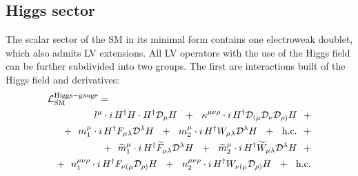\documentclass[12pt,preprintnumbers,nofootinbib]{revtex4}
\newcommand{\wt}{\widetilde}
\newcommand{\md}{\mathcal{D}}
\begin{document}
\subsection{Higgs sector}	
	The scalar sector of the SM in its minimal form contains one electroweak doublet,
which also admits LV extensions. All LV operators with the use of the Higgs field can 
be further subdivided into two groups. 
	The first are interactions built of the Higgs field and 
	derivatives:
\begin{eqnarray}
\nonumber
\lefteqn{
	\mathcal{L}_{\rm SM}^{\rm Higgs-gauge} =
	}
	\\
\nonumber
	&&
	\phantom{+~~}
	l^\mu \cdot
	i\, 
	H^\dag H \cdot H^\dag \md_\mu H
	~~+~~
	\kappa^{\mu\nu\rho} \cdot
	i\, 
	H^\dag \md_{(\mu} \md_\nu \md_{\rho)} H
	~~+
	\\
\label{Higgs_gauge}
	&&
	+~~
	m^\mu_1 \cdot
	i\, 
	H^\dag F_{\mu\lambda} \md^\lambda H
	~~+~~
	m^\mu_2 \cdot
	i\, 
	H^\dag W_{\mu\lambda} \md^\lambda H
	~~+~~
	\text{h.c.}
	~~+
	\\
\nonumber
	&&
	+~~
	\wt{m}^\mu_1 \cdot
	i\, 
	H^\dag \wt{F}_{\mu\lambda} \md^\lambda H
	~~+~~
	\wt{m}^\mu_2 \cdot
	i\, 
	H^\dag \wt{W}_{\mu\lambda} \md^\lambda H
	~~+
	\\
\nonumber
	&&
	+~~
	n^{\mu\nu\rho}_{1} \cdot
	i\, 
	H^\dag F_{\nu(\mu} \md_{\rho)} H
	~~+~~
	n^{\mu\nu\rho}_{2} \cdot
	i\, 
	H^\dag W_{\nu(\mu} \md_{\rho)}  H
	~~+~~
	\text{h.c.}
\end{eqnarray}
\end{document}
